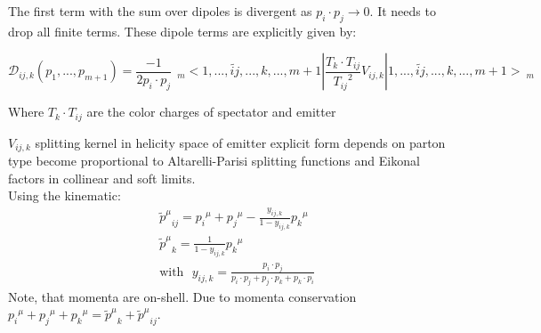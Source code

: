 The first term with the sum over dipoles is divergent as $ p_i \cdot p_j \rightarrow 0 $. It needs to drop all finite terms.
These dipole terms are explicitly given by:

\begin{equation}
 {{\mathcal{D}}}_{ij,k}(p_1,...,p_{m+1}) = \frac{-1}{2p_i \cdot p_j} \:\:_m<1,...,\tilde{ij},...,k,...,m+1 |\frac{T_k \cdot T_{ij}}{{T_{ij}}^2} V_{ij,k}| 1,...,\tilde{ij},...,k,...,m+1 >\:_m
\end{equation}

Where $ T_k \cdot T_{ij} $ are the color charges of spectator and emitter

$ V_{ij,k} $ splitting kernel in helicity space of emitter
explicit form depends on parton type become proportional to Altarelli-Parisi splitting functions and Eikonal factors
in collinear and soft limits.\\
Using the kinematic:
\begin{equation}
\begin{split}
&{\tilde{p}^{\mu}}_{ij} = {p_i}^{\mu}+{p_j}^{\mu}-\frac{y_{ij,k}}{1-y_{ij,k}}{p_k}^{\mu}\\
&{\tilde{p}^{\mu}}_{k} = \frac{1}{1-y_{ij,k}}{p_k}^{\mu}\\
&\text{with}\:\:\:y_{ij,k}=\frac{p_i \cdot p_j}{p_i \cdot p_j+p_j \cdot p_k+p_k \cdot p_i}
\end{split}
\end{equation}
Note, that momenta are on-shell. Due to momenta conservation ${p_i}^{\mu}+{p_j}^{\mu}+{p_k}^{\mu}= {\tilde{p}^{\mu}}_{k} +{\tilde{p}^{\mu}}_{ij} $. 





\newpage
